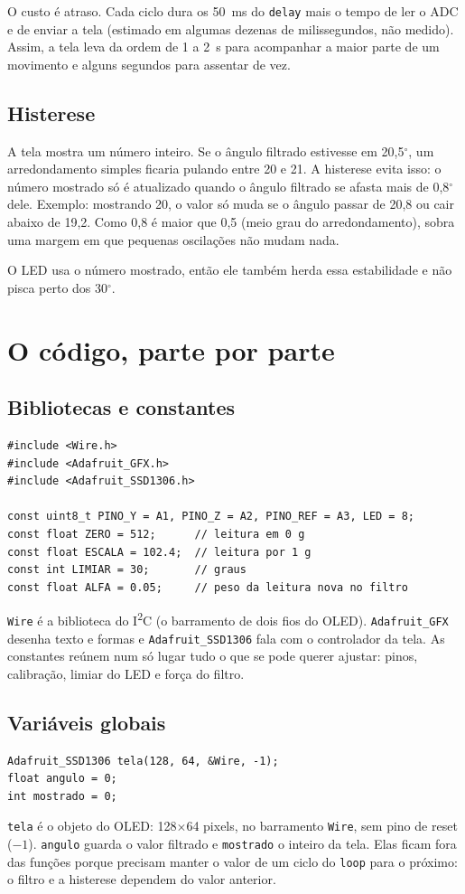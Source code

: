 \documentclass[11pt,a4paper]{article}
\begin{document}
O custo é atraso. Cada ciclo dura os 50~ms do \texttt{delay} mais o
tempo de ler o ADC e de enviar a tela (estimado em algumas dezenas de
milissegundos, não medido). Assim, a tela leva da ordem de 1 a 2~s
para acompanhar a maior parte de um movimento e alguns segundos para
assentar de vez.

\subsection{Histerese}\label{sec:hist}
A tela mostra um número inteiro. Se o ângulo filtrado estivesse em
20,5$^\circ$, um arredondamento simples ficaria pulando entre 20 e 21.
A histerese evita isso: o número mostrado só é atualizado quando o
ângulo filtrado se afasta mais de 0,8$^\circ$ dele. Exemplo: mostrando
20, o valor só muda se o ângulo passar de 20,8 ou cair abaixo de 19,2.
Como 0,8 é maior que 0,5 (meio grau do arredondamento), sobra uma
margem em que pequenas oscilações não mudam nada.

O LED usa o número mostrado, então ele também herda essa estabilidade
e não pisca perto dos 30$^\circ$.

\section{O código, parte por parte}

\subsection{Bibliotecas e constantes}
\begin{lstlisting}
#include <Wire.h>
#include <Adafruit_GFX.h>
#include <Adafruit_SSD1306.h>

const uint8_t PINO_Y = A1, PINO_Z = A2, PINO_REF = A3, LED = 8;
const float ZERO = 512;      // leitura em 0 g
const float ESCALA = 102.4;  // leitura por 1 g
const int LIMIAR = 30;       // graus
const float ALFA = 0.05;     // peso da leitura nova no filtro
\end{lstlisting}
\texttt{Wire} é a biblioteca do I\textsuperscript{2}C (o barramento de
dois fios do OLED). \texttt{Adafruit\_GFX} desenha texto e formas e
\texttt{Adafruit\_SSD1306} fala com o controlador da tela. As
constantes reúnem num só lugar tudo o que se pode querer ajustar:
pinos, calibração, limiar do LED e força do filtro.

\subsection{Variáveis globais}
\begin{lstlisting}
Adafruit_SSD1306 tela(128, 64, &Wire, -1);
float angulo = 0;
int mostrado = 0;
\end{lstlisting}
\texttt{tela} é o objeto do OLED: 128$\times$64 pixels, no barramento
\texttt{Wire}, sem pino de reset ($-1$). \texttt{angulo} guarda o
valor filtrado e \texttt{mostrado} o inteiro da tela. Elas ficam fora
das funções porque precisam manter o valor de um ciclo do
\texttt{loop} para o próximo: o filtro e a histerese dependem do valor
anterior.
\end{document}
